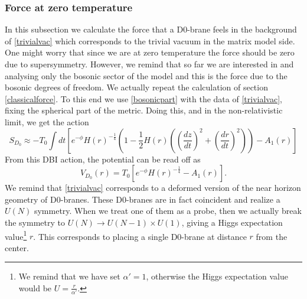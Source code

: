 \documentclass[11pt,english]{article}
\newcommand{\be}{\begin{equation}}
\newcommand{\ee}{\end{equation}}
\numberwithin{equation}{section}
\begin{document}
\subsubsection{Force at zero temperature}
In this subsection we calculate the force that a D0-brane feels in the background of \eqref{trivialvac} which corresponds to the trivial vacuum in the matrix model side. One might worry that since we are at zero temperature the force should be zero due to supersymmetry. However, we remind that so far we are interested in and analysing only the bosonic sector of the model and this is the force due to the bosonic degrees of freedom.  We actually repeat the calculation of section \ref{classicalforce}. To this end we use \eqref{bosonicpart} with the data of \eqref{trivialvac}, fixing the spherical part of the metric. Doing this, and in the non-relativistic limit, we get the action 
\be 
S_{D_0}\approx-T_0\int dt\left[e^{-\phi}H(r)^{-\frac{1}{4}}\left(1-\frac{1}{2}H(r)\left(\left(\frac{dz}{dt}\right)^2+\left(\frac{dr}{dt}\right)^2\right)\right)-A_1(r)\right]
\ee
From this DBI action, the potential can be read off as 
\be \label{potential}
V_{D_0}(r)=T_0\left[ e^{-\phi}H(r)^{-\frac{1}{4}}-A_1(r)\right].
\ee
We remind that \eqref{trivialvac} corresponds to a deformed version of the near horizon geometry of D0-branes. These D0-branes are in fact coincident and realize a $U(N)$ symmetry. When we treat one of them as a probe, then we actually break the symmetry to $U(N)\to U(N-1)\times U(1)$, giving a Higgs expectation value\footnote{We remind that we have set $\alpha'=1$, otherwise the Higgs expectation value would be $U=\frac{r}{\alpha'}$.}
 $r$. This corresponds to placing a single D0-brane at distance $r$ from the center.
 
\end{document}
